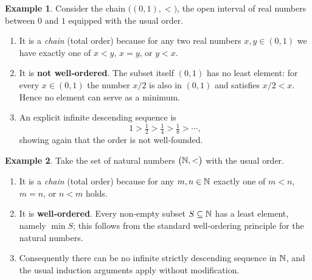\documentclass[12pt]{article}
\theoremstyle{definition} %
\newtheorem{example}{Example}
\theoremstyle{plain} %
\begin{document}
\begin{example}
    Consider the chain $\bigl((0,1),<\bigr)$, the open interval of real numbers
    between $0$ and $1$ equipped with the usual order.

    \begin{enumerate}
        \item It is a \emph{chain} (total order) because for any two real
              numbers $x,y\in(0,1)$ we have exactly one of $x<y$, $x=y$, or
              $y<x$.

        \item It is \textbf{not well‑ordered}.  
              The subset itself $(0,1)$ has no least element:
              for every $x\in(0,1)$ the number $x/2$ is also in $(0,1)$ and
              satisfies $x/2<x$.  Hence no element can serve as a minimum.

        \item An explicit infinite descending sequence is
              \[
                  1>\tfrac12>\tfrac14>\tfrac18>\dotsb,
              \]
              showing again that the order is not well‑founded.
    \end{enumerate}
\end{example}

\begin{example}
    Take the set of natural numbers $\bigl(\Bbb N,<\bigr)$ with the usual order.

    \begin{enumerate}
        \item It is a \emph{chain} (total order) because for any $m,n\in\Bbb N$
              exactly one of $m<n$, $m=n$, or $n<m$ holds.

        \item It is \textbf{well‑ordered}.  
              Every non‑empty subset $S\subseteq\Bbb N$ has a least element,
              namely $\min S$; this follows from the standard well‑ordering
              principle for the natural numbers.

        \item Consequently there can be no infinite strictly descending
              sequence in $\Bbb N$, and the usual induction arguments apply
              without modification.
    \end{enumerate}
\end{example}
\end{document}
